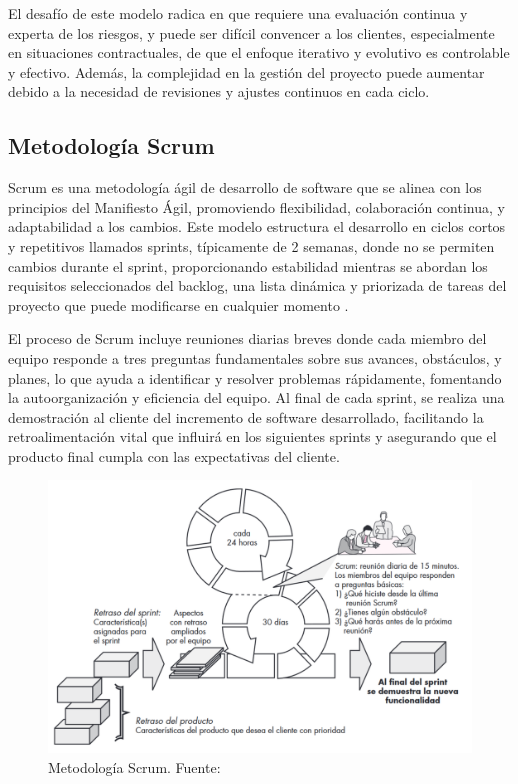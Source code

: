 El desafío de este modelo radica en que requiere una evaluación continua y experta de los riesgos, y puede ser difícil convencer a los clientes, especialmente en situaciones contractuales, de que el enfoque iterativo y evolutivo es controlable y efectivo. Además, la complejidad en la gestión del proyecto puede aumentar debido a la necesidad de revisiones y ajustes continuos en cada ciclo.

\subsection{Metodología Scrum}

Scrum es una metodología ágil de desarrollo de software que se alinea con los principios del Manifiesto Ágil, promoviendo flexibilidad, colaboración continua, y adaptabilidad a los cambios. Este modelo estructura el desarrollo en ciclos cortos y repetitivos llamados sprints, típicamente de 2 semanas, donde no se permiten cambios durante el sprint, proporcionando estabilidad mientras se abordan los requisitos seleccionados del backlog, una lista dinámica y priorizada de tareas del proyecto que puede modificarse en cualquier momento \cite{pressman2010ingeneria}.

El proceso de Scrum incluye reuniones diarias breves donde cada miembro del equipo responde a tres preguntas fundamentales sobre sus avances, obstáculos, y planes, lo que ayuda a identificar y resolver problemas rápidamente, fomentando la autoorganización y eficiencia del equipo. Al final de cada sprint, se realiza una demostración al cliente del incremento de software desarrollado, facilitando la retroalimentación vital que influirá en los siguientes sprints y asegurando que el producto final cumpla con las expectativas del cliente.

\begin{figure}[h]
	\centering
	\includegraphics[width=\linewidth]{Figures/model-scrum.png}
	\caption{Metodología Scrum. Fuente: \cite{pressman2010ingeneria}}
\end{figure}

